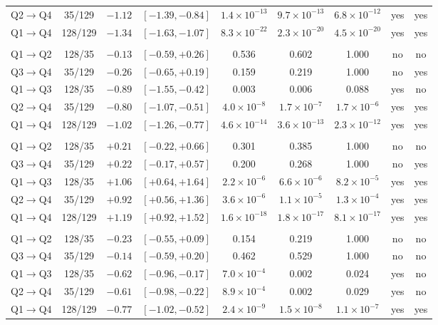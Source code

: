 \begin{longtable}{lcrcccccc}
\quad Q2$\to$Q4 & 35/129 & $-1.12$ & $[-1.39, -0.84]$ & $1.4\times10^{-13}$ & $9.7\times10^{-13}$ & $6.8\times10^{-12}$ & yes & yes \\
\quad Q1$\to$Q4 & 128/129 & $-1.34$ & $[-1.63, -1.07]$ & $8.3\times10^{-22}$ & $2.3\times10^{-20}$ & $4.5\times10^{-20}$ & yes & yes \\
\addlinespace[3pt]
\multicolumn{9}{l}{\textbf{Degree entropy ($H$)}} \\*
\quad Q1$\to$Q2 & 128/35 & $-0.13$ & $[-0.59, +0.26]$ & 0.536 & 0.602 & 1.000 & no & no \\
\quad Q3$\to$Q4 & 35/129 & $-0.26$ & $[-0.65, +0.19]$ & 0.159 & 0.219 & 1.000 & no & yes \\
\quad Q1$\to$Q3 & 128/35 & $-0.89$ & $[-1.55, -0.42]$ & 0.003 & 0.006 & 0.088 & yes & no \\
\quad Q2$\to$Q4 & 35/129 & $-0.80$ & $[-1.07, -0.51]$ & $4.0\times10^{-8}$ & $1.7\times10^{-7}$ & $1.7\times10^{-6}$ & yes & yes \\
\quad Q1$\to$Q4 & 128/129 & $-1.02$ & $[-1.26, -0.77]$ & $4.6\times10^{-14}$ & $3.6\times10^{-13}$ & $2.3\times10^{-12}$ & yes & yes \\
\addlinespace[3pt]
\multicolumn{9}{l}{\textbf{Mean eigenvector centrality}} \\*
\quad Q1$\to$Q2 & 128/35 & $+0.21$ & $[-0.22, +0.66]$ & 0.301 & 0.385 & 1.000 & no & no \\
\quad Q3$\to$Q4 & 35/129 & $+0.22$ & $[-0.17, +0.57]$ & 0.200 & 0.268 & 1.000 & no & yes \\
\quad Q1$\to$Q3 & 128/35 & $+1.06$ & $[+0.64, +1.64]$ & $2.2\times10^{-6}$ & $6.6\times10^{-6}$ & $8.2\times10^{-5}$ & yes & yes \\
\quad Q2$\to$Q4 & 35/129 & $+0.92$ & $[+0.56, +1.36]$ & $3.6\times10^{-6}$ & $1.1\times10^{-5}$ & $1.3\times10^{-4}$ & yes & yes \\
\quad Q1$\to$Q4 & 128/129 & $+1.19$ & $[+0.92, +1.52]$ & $1.6\times10^{-18}$ & $1.8\times10^{-17}$ & $8.1\times10^{-17}$ & yes & yes \\
\addlinespace[3pt]
\multicolumn{9}{l}{\textbf{Assortativity ($r$)}} \\*
\quad Q1$\to$Q2 & 128/35 & $-0.23$ & $[-0.55, +0.09]$ & 0.154 & 0.219 & 1.000 & no & no \\
\quad Q3$\to$Q4 & 35/129 & $-0.14$ & $[-0.59, +0.20]$ & 0.462 & 0.529 & 1.000 & no & no \\
\quad Q1$\to$Q3 & 128/35 & $-0.62$ & $[-0.96, -0.17]$ & $7.0\times10^{-4}$ & 0.002 & 0.024 & yes & no \\
\quad Q2$\to$Q4 & 35/129 & $-0.61$ & $[-0.98, -0.22]$ & $8.9\times10^{-4}$ & 0.002 & 0.029 & yes & no \\
\quad Q1$\to$Q4 & 128/129 & $-0.77$ & $[-1.02, -0.52]$ & $2.4\times10^{-9}$ & $1.5\times10^{-8}$ & $1.1\times10^{-7}$ & yes & yes \\
\end{longtable}
\endgroup
